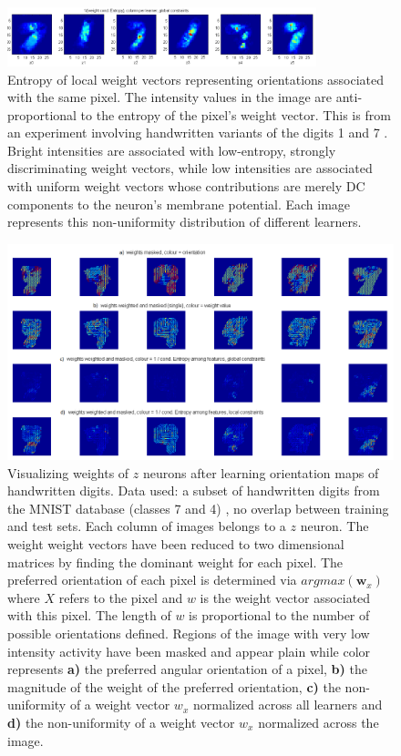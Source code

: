 \documentclass{report}
\begin{document}
\begin{figure}[ht]
\centering
\includegraphics[width=0.8\textwidth]{weightCondEntropy}
\caption{Entropy of local weight vectors representing orientations associated with the same pixel. The intensity values in the image are anti-proportional to the entropy of the pixel's weight vector. This is from an experiment involving handwritten variants of the digits 1 and 7 \cite{LeCun1998}. Bright intensities are associated with low-entropy, strongly discriminating weight vectors, while low intensities are associated with uniform weight vectors whose contributions are merely DC components to the neuron's membrane potential. Each image represents this non-uniformity distribution of different learners.
\label{fig:weightCondEntropy}}
\end{figure}

\begin{figure}[ht]
\centering
\includegraphics[width=1.2\textwidth]{weightMaps47_masked}
\caption{Visualizing weights of $z$ neurons after learning orientation maps of handwritten digits. Data used: a subset of handwritten digits from the MNIST database (classes 7 and 4) \cite{LeCun1998}, no overlap between training and test sets. Each column of images belongs to a $z$ neuron. The weight weight vectors have been reduced to two dimensional matrices by finding the dominant weight for each pixel. The preferred orientation of each pixel is determined via $argmax(\textbf{w}_x)$ where $X$ refers to the pixel and $w$ is the weight vector associated with this pixel. The length of \textbf{$w$} is proportional to the number of possible orientations defined. Regions of the image with very low intensity activity have been masked and appear plain while color represents  \textbf{a)} the preferred angular orientation of a pixel, \textbf{b)} the magnitude of the weight of the preferred orientation, \textbf{c)} the non-uniformity of a weight vector \textbf{$w_x$} normalized across all learners and \textbf{d)} the non-uniformity of a weight vector \textbf{$w_x$} normalized across the image. 
\label{fig:weightMaps47_masked}}
\end{figure}
\end{document}
